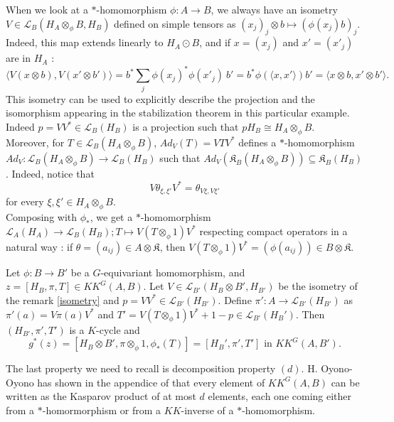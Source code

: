 \begin{rk}\label{isometry}
When we look at a $*$-homomorphism $\phi : A\rightarrow B$, we always have an isometry $V\in \mathcal L_B ( H_A\otimes_\phi B , H_B)$ defined on simple tensors as $(x_j)_j\otimes b \mapsto (\phi(x_j)b)_j$. Indeed, this map extends linearly to $H_A \odot B$, and if $x = (x_j)$ and $x'=(x'_j)$ are in $H_A$ : 
\[\langle V (x\otimes b) , V(x'\otimes b')\rangle = b^* \sum_j \phi(x_j)^* \phi(x'_j) \  b' = b^*\phi(\langle x, x' \rangle)b' = \langle x\otimes b , x'\otimes b' \rangle . \] %
This isometry can be used to explicitly describe the projection and the isomorphism appearing in the stabilization theorem in this particular example. Indeed $p = VV^*\in\mathcal L_B(H_B)$ is a projection such that $p H_B \cong H_A\otimes_\phi B $.\\

Moreover, for $T\in \mathcal L_B(H_A\otimes_\phi B)$, $Ad_V(T) = VTV^*$ defines a $*$-homomorphism $Ad_V : \mathcal L_B(H_A\otimes_\phi B)\rightarrow \mathcal L_B(H_B)$ such that $Ad_V(\mathfrak K_B(H_A\otimes_\phi B))\subseteq \mathfrak K_B(H_B)$. Indeed, notice that 
\[V\theta_{\xi,\xi'}V^* = \theta_{V\xi,V\xi'}\]
for every $\xi,\xi'\in H_A\otimes_\phi B$.\\

Composing with $\phi_*$, we get a $*$-homomorphism $\mathcal L_A(H_A)\rightarrow \mathcal L_B(H_B); T\mapsto V(T\otimes_\phi 1)V^*$ respecting compact operators in a natural way : if $\theta = (a_{ij})\in A\otimes\mathfrak K$, then $V(T\otimes_\phi 1)V^* = (\phi(a_{ij}))\in B\otimes\mathfrak K$.  
\end{rk}

\begin{lem}\label{isometryKK}
Let $\phi : B\rightarrow B'$ be a $G$-equivariant homomorphism, and $z=[H_B,\pi, T]\in KK^G(A,B)$. Let $V\in\mathcal L_{B'}(H_B\otimes B', H_{B'})$ be the isometry of the remark \ref{isometry} and $p = VV^*\in\mathcal L_{B'}(H_{B'})$. Define $\pi' : A\rightarrow \mathcal L_{B'}(H_{B'})$ as $\pi'(a) = V\pi(a)V^*$ and $T'= V(T\otimes_\phi 1)V^* + 1-p \in \mathcal L_{B'}(H_B')$. Then $(H_{B'},\pi',T')$ is a $K$-cycle and 
\[g^*(z) = [H_B\otimes B',\pi\otimes_\phi 1,\phi_*(T)]=[H_B', \pi', T']\text{ in } KK^G(A,B').\]
\end{lem} 

The last property we need to recall is decomposition property $(d)$. H. Oyono-Oyono has shown in the appendice of \cite{LaffOY} that every element of $KK^G(A,B)$ can be written as the Kasparov product of at most $d$ elements, each one coming either from a $*$-homormorphism or from a $KK$-inverse of a $*$-homomorphism.\\

